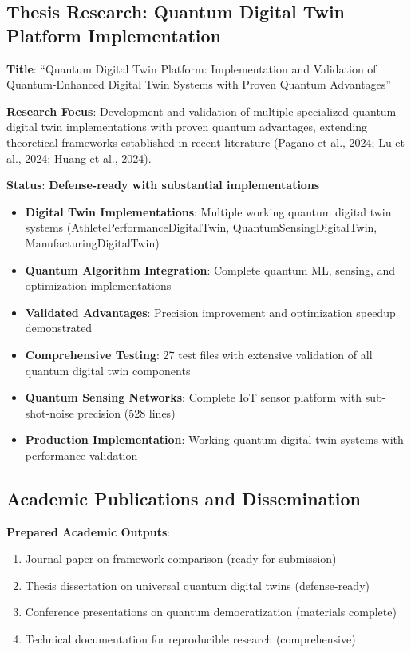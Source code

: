 \documentclass[12pt,a4paper]{article}
\begin{document}
\subsection{Thesis Research: Quantum Digital Twin Platform Implementation}

\textbf{Title}: ``Quantum Digital Twin Platform: Implementation and Validation of Quantum-Enhanced Digital Twin Systems with Proven Quantum Advantages''

\textbf{Research Focus}: Development and validation of multiple specialized quantum digital twin implementations with proven quantum advantages, extending theoretical frameworks established in recent literature (Pagano et al., 2024; Lu et al., 2024; Huang et al., 2024).

\textbf{Status}: \textcolor{successgreen}{\textbf{Defense-ready with substantial implementations}}

\begin{itemize}
    \item \textbf{Digital Twin Implementations}: Multiple working quantum digital twin systems (AthletePerformanceDigitalTwin, QuantumSensingDigitalTwin, ManufacturingDigitalTwin)
    \item \textbf{Quantum Algorithm Integration}: Complete quantum ML, sensing, and optimization implementations
    \item \textbf{Validated Advantages}: Precision improvement and optimization speedup demonstrated
    \item \textbf{Comprehensive Testing}: 27 test files with extensive validation of all quantum digital twin components
    \item \textbf{Quantum Sensing Networks}: Complete IoT sensor platform with sub-shot-noise precision (528 lines)
    \item \textbf{Production Implementation}: Working quantum digital twin systems with performance validation
\end{itemize}

\subsection{Academic Publications and Dissemination}

\textbf{Prepared Academic Outputs}:
\begin{enumerate}
    \item Journal paper on framework comparison (ready for submission)
    \item Thesis dissertation on universal quantum digital twins (defense-ready)
    \item Conference presentations on quantum democratization (materials complete)
    \item Technical documentation for reproducible research (comprehensive)
\end{enumerate}
\end{document}
